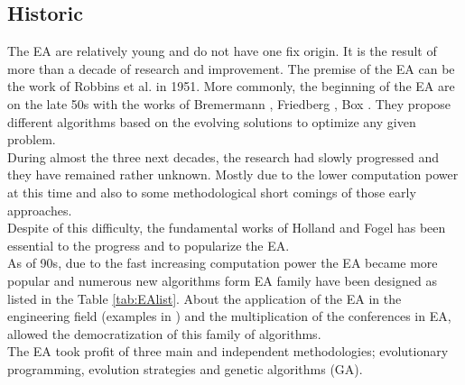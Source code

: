 \subsection{Historic}

The EA are relatively young and do not have one fix origin. It is the result of more than a decade of research and improvement.
The premise of the EA can be the work of Robbins et al.  \cite{184*robbins1951} in 1951. 
More commonly, the beginning of the EA are on the late 50s with the works of Bremermann \cite{185*bremermann1962}, Friedberg \cite{186*friedberg1958}, Box \cite{187*box1957}. They propose different algorithms based on the evolving solutions to optimize any given problem.\\ 
During almost the three next decades, the research had slowly progressed and they have remained rather unknown. Mostly due to the lower computation power at this time and also to some methodological short comings of
those early approaches. \\
Despite of this difficulty, the fundamental works of Holland \cite{111*Holland1962}  and Fogel  has been essential to the progress and to popularize the EA. \\
As of 90s, due to the fast increasing computation power the EA became more popular and numerous new algorithms form EA family have been designed  as listed in the Table \ref{tab:EAlist}. About the application of the EA in the engineering field (examples in \cite{10in182*alander1994}) and the multiplication of the conferences in EA, allowed the democratization of this family of algorithms.\\
The EA  took profit of three main and independent methodologies; evolutionary programming, evolution strategies and genetic algorithms (GA). 

